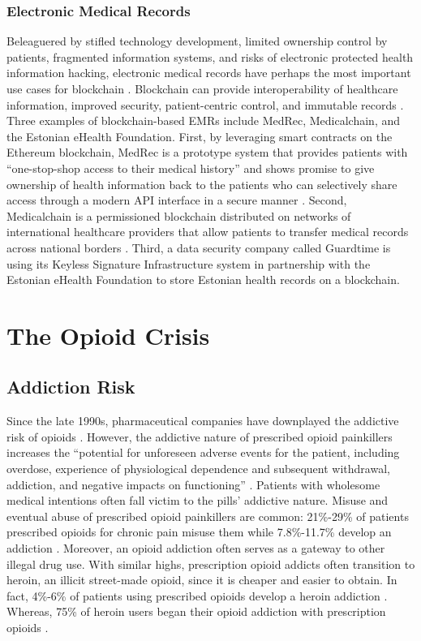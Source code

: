 \documentclass[sigconf]{acmart}
\begin{document}
\subsubsection{Electronic Medical Records} Beleaguered by stifled technology development, limited ownership control by patients, fragmented information systems, and risks of electronic protected health information hacking, electronic medical records have perhaps the most important use cases for blockchain \cite{yuan2016blockchains}. Blockchain can provide interoperability of healthcare information, improved security, patient-centric control, and immutable records \cite{das2017}. Three examples of blockchain-based EMRs include MedRec, Medicalchain, and the Estonian eHealth Foundation. First, by leveraging smart contracts on the Ethereum blockchain, MedRec is a prototype system that provides patients with ``one-stop-shop access to their medical history'' and shows promise to give ownership of health information back to the patients who can selectively share access through a modern API interface in a secure manner \cite{ekblaw2016medrec}. Second, Medicalchain is a permissioned blockchain distributed on networks of international healthcare providers that allow patients to transfer medical records across national borders \cite{hitchingHealthcare}. Third, a data security company called Guardtime is using its Keyless Signature Infrastructure system in partnership with the Estonian eHealth Foundation to store Estonian health records on a blockchain.

\section{The Opioid Crisis}
\subsection{Addiction Risk}
Since the late 1990s, pharmaceutical companies have downplayed the addictive risk of opioids \cite{opsis1}. However, the addictive nature of prescribed opioid painkillers increases the ``potential for unforeseen adverse events for the patient, including overdose, experience of physiological dependence and subsequent withdrawal, addiction, and negative impacts on functioning'' \cite{Vowles01}. Patients with wholesome medical intentions often fall victim to the pills' addictive nature. Misuse and eventual abuse of prescribed opioid painkillers are common: 21\%-29\% of patients prescribed opioids for chronic pain misuse them while 7.8\%-11.7\% develop an addiction \cite{Vowles01}. Moreover, an opioid addiction often serves as a gateway to other illegal drug use. With similar highs, prescription opioid addicts often transition to heroin, an illicit street-made opioid, since it is cheaper and easier to obtain. In fact, 4\%-6\% of patients using prescribed opioids develop a heroin addiction \cite{opsis1}. Whereas, 75\% of heroin users began their opioid addiction with prescription opioids \cite{Cicero01}.
\end{document}

